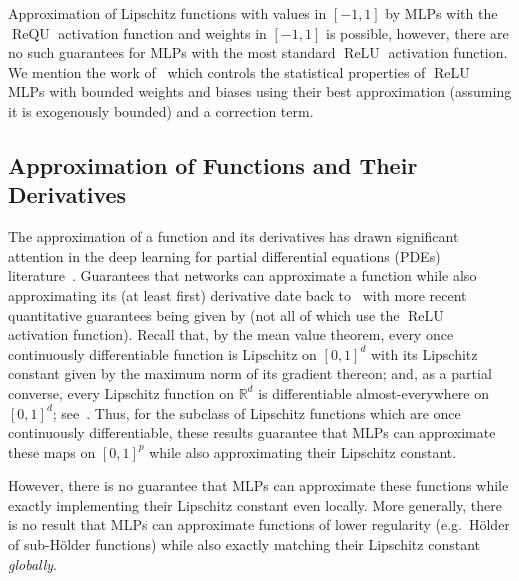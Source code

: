 \documentclass{article}
\numberwithin{equation}{section}
\theoremstyle{definition}
\begin{document}
Approximation of Lipschitz functions with values in $[-1,1]$ by MLPs with the $\operatorname{ReQU}$ activation function and weights in $[-1,1]$ is possible, however, there are no such guarantees for MLPs with the most standard $\operatorname{ReLU}$ activation function.  We mention the work of~\cite{belomestny2023simultaneous} which controls the statistical properties of $\operatorname{ReLU}$ MLPs with bounded weights and biases using their best approximation (assuming it is exogenously bounded) and a correction term.

\subsection{Approximation of Functions and Their Derivatives}
\label{s:Related__ss:Deriv}
The approximation of a function and its derivatives has drawn significant attention in the deep learning for partial differential equations (PDEs) literature~\cite{MR4376568,guhring2021approximation,MR4376559,MR3736669,MR3847747,lei2022solving,MR3847747,MR4514159,MR4539210,MR4555161}.
Guarantees that networks can approximate a function while also approximating its (at least first) derivative date back to~\cite{hornik1990universal_derivatives} with more recent quantitative guarantees being given by \cite{MR4131039,guhring2021approximation,belomestny2023simultaneous,neufeld2023universal} (not all of which use the $\operatorname{ReLU}$ activation function).  Recall that, by the mean value theorem, every once continuously differentiable function is Lipschitz on $[0,1]^d$ with its Lipschitz constant given by the maximum norm of its gradient thereon; and, as a partial converse, every Lipschitz function on $\mathbb{R}^d$ is differentiable almost-everywhere on $[0,1]^d$; see~\cite[Theorem 3.1.6]{Federer_GeometricMeasureTheory_Book_1968}.  
Thus, for the subclass of Lipschitz functions which are once continuously differentiable, these results guarantee that MLPs can approximate these maps on $[0,1]^p$ while also approximating their Lipschitz constant.  

However, there is no guarantee that MLPs can approximate these functions while exactly implementing their Lipschitz constant even locally.  More generally, there is no result that MLPs can approximate functions of lower regularity (e.g.\ H\"{o}lder of sub-H\"{o}lder functions) while also exactly matching their Lipschitz constant \textit{globally}. 
\end{document}
